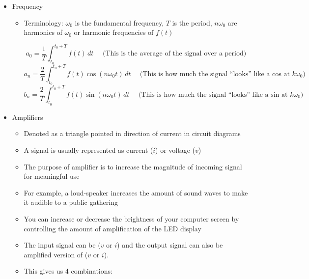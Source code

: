 \begin{itemize}

  \item Frequency

    \begin{itemize}

      \item Terminology: $\omega_0$ is the fundamental frequency, $T$ is the period, $n\omega_0$ are harmonics of $\omega_0$ or harmonic frequencies of $f(t)$

        $$a_0=\frac{1}{T}\int_{t_0}^{t_0+T} f(t)\,dt\,\,\,\,\,\,\,\,\text{(This is the average of the signal over a period)}$$
        $$a_n=\frac{2}{T}\int_{t_0}^{t_0+T} f(t)\cos(n\omega_0t)\,dt\,\,\,\,\,\,\,\,\text{(This is how much the signal “looks” like a cos at $k\omega_0$)}$$
        $$b_n=\frac{2}{T}\int_{t_0}^{t_0+T} f(t)\sin(n\omega_0t)\,dt\,\,\,\,\,\,\,\,\text{(This is how much the signal “looks” like a sin at $k\omega_0$)}$$

    \end{itemize}

  \item Amplifiers

    \begin{itemize}

      \item Denoted as a triangle pointed in direction of current in circuit diagrams

      \item A signal is usually represented as current ($i$) or voltage ($v$)

      \item The purpose of amplifier is to increase the magnitude of incoming signal for meaningful use

      \item For example, a loud-speaker increases the amount of sound waves to make it audible to a public gathering

      \item You can increase or decrease the brightness of your computer screen by controlling the amount of amplification of the LED display

      \item The input signal can be ($v$ or $i$) and the output signal can also be amplified version of ($v$ or $i$).

      \item This gives us 4 combinations:

        \begin{enumerate}


\end{enumerate}
\end{itemize}
\end{itemize}
